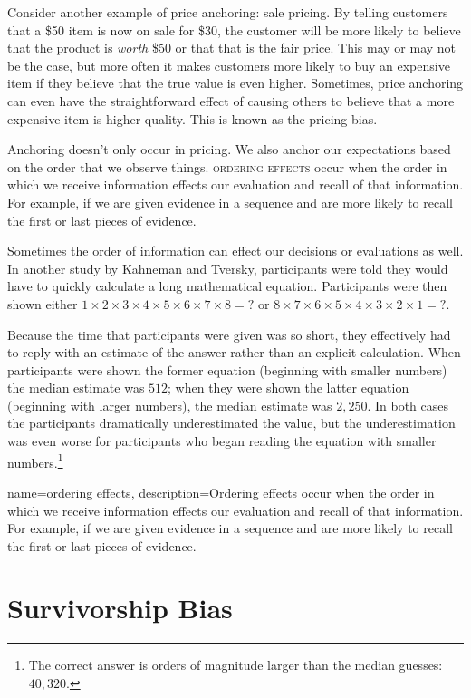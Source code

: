Consider another example of price anchoring: sale pricing. By telling customers that a \$50 item is now on sale for \$30, the customer will be more likely to believe that the product is \emph{worth} \$50 or that that is the fair price. This may or may not be the case, but more often it makes customers more likely to buy an expensive item if they believe that the true value is even higher. Sometimes, price anchoring can even have the straightforward effect of causing others to believe that a more expensive item is higher quality. This is known as the pricing bias.

Anchoring doesn't only occur in pricing. We also anchor our expectations based on the order that we observe things. \textsc{\Gls{ordering effects}} occur when the order in which we receive information effects our evaluation and recall of that information. For example, if we are given evidence in a sequence and are more likely to recall the first or last pieces of evidence.

Sometimes the order of information can effect our decisions or evaluations as well. In another study by Kahneman and Tversky, participants were told they would have to quickly calculate a long mathematical equation. Participants were then shown either $1\times 2\times 3\times 4\times 5\times 6\times 7\times 8 = ?$ or  $ 8\times 7\times 6\times 5\times 4\times 3\times 2\times 1 = ?$.

Because the time that participants were given was so short, they effectively had to reply with an estimate of the answer rather than an explicit calculation. When participants were shown the former equation (beginning with smaller numbers) the median estimate was $512$; when they were shown the latter equation (beginning with larger numbers), the median estimate was $2,250$. In both cases the participants dramatically underestimated the value, but the underestimation was even worse for participants who began reading the equation with smaller numbers.\footnote{The correct answer is orders of magnitude larger than the median guesses: $40,320$.}

{
name=ordering effects,
description={Ordering effects occur when the order in which we receive information effects our evaluation and recall of that information. For example, if we are given evidence in a sequence and are more likely to recall the first or last pieces of evidence.}
}

\section{Survivorship Bias}

